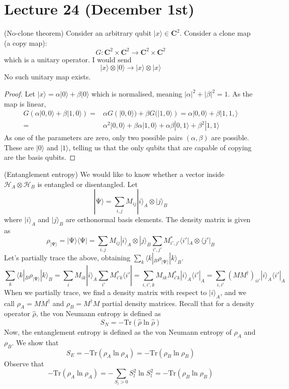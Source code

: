 \section{Lecture 24 (December 1st)}
\begin{thm}
(No-clone theorem) Consider an arbitrary qubit $|x\rangle \in {\bm C}^2$. Consider a clone map (a copy map):
\[G:{\bm C}^2\times {\bm C}^2\rightarrow {\bm C}^2\times {\bm C}^2\]
which is a unitary operator. I would send
\[|x\rangle \otimes |0\rangle \rightarrow |x\rangle \otimes |x\rangle \]
No such unitary map exists. 
\end{thm}
\vspace{2ex}
\begin{proof}
Let $|x\rangle =\alpha |0\rangle +\beta |0\rangle $ which is normalised, meaning $|\alpha |^2+|\beta |^2=1$. As the map is linear,
\[\begin{align*}
G(\alpha |0,0\rangle +\beta |1,0\rangle )=&\alpha G(|0,0\rangle )+\beta G(|1,0\rangle )=\alpha |0,0\rangle +\beta |1,1,\rangle \\
=&\alpha ^2|0,0\rangle +\beta \alpha |1,0\rangle +\alpha \beta |0,1\rangle +\beta ^2|1,1\rangle 
\end{align*}\]
As one of the parameters are zero, only two possible pairs $(\alpha ,\beta )$ are possible. These are $|0\rangle $ and $|1\rangle $, telling us that the only qubits that are capable of copying are the basis qubits.
\end{proof}
\vspace{2ex}
\begin{thm}
(Entanglement entropy) We would like to know whether a vector inside $\mathcal{H}_{A}\otimes \mathcal{H}_{B}$ is entangled or disentangled. Let
\[|\mathrm{\Psi} \rangle =\sum _{i,j}M_{ij}|i\rangle _{A}\otimes |j\rangle _{B} \]
where $|i\rangle _{A}$ and $|j\rangle _{B}$ are orthonormal basis elements. The density matrix is given as
\[\rho _{|\mathrm{\Psi} \rangle }=|\mathrm{\Psi} \rangle \langle \mathrm{\Psi} |=\sum _{i,j}M_{ij}|i\rangle _{A}\otimes |j\rangle _{B}\sum _{i',j'}M^{*}_{i',j'}\langle i'|_{A}\otimes \langle j'|_{B} \]
Let's partially trace the above, obtaining $\sum _{k}\langle k|_{B}\rho _{|\mathrm{\Psi} \rangle }|k\rangle _{B}$. 
\[\sum _{k}\langle k|_{B}\rho _{|\mathrm{\Psi} \rangle }|k\rangle _{B}=\sum _{i}M_{ik}|i\rangle _{A}\sum _{i'}M_{i'k}^{*}\langle i'|=\sum _{i,i',k}M_{ik}M^{*}_{i'k}|i\rangle _{A}\langle i'|_{A}=\sum _{i,i'}(MM^{\dagger })_{ii'}|i\rangle _{A}\langle i'|_{A}\]
When we partially trace, we find a density matrix with respect to $|i\rangle _{A}$, and we call $\rho _{A}=MM^{\dagger }$ and $\rho _{B}=M^{\dagger }M$ partial density matrices. Recall that for a density operator $\hat{\rho }$, the von Neumann entropy is defined as
\[S_{N}=-\mathrm{Tr}(\hat{\rho }\ln \hat{\rho })\]
Now, the entanglement entropy is defined as the von Neumann entropy of $\rho _{A}$ and $\rho _{B}$. We show that
\[S_{E}=-\mathrm{Tr}(\rho _{A}\ln \rho _{A})=-\mathrm{Tr}(\rho _{B}\ln \rho _{B})\]
Observe that
\[-\mathrm{Tr}(\rho _{A}\ln \rho _{A})=-\sum _{S_{l}>0}S_{l}^2\ln S_{l}^2=-\mathrm{Tr}(\rho _{B}\ln \rho _{B})\]
\end{thm}
